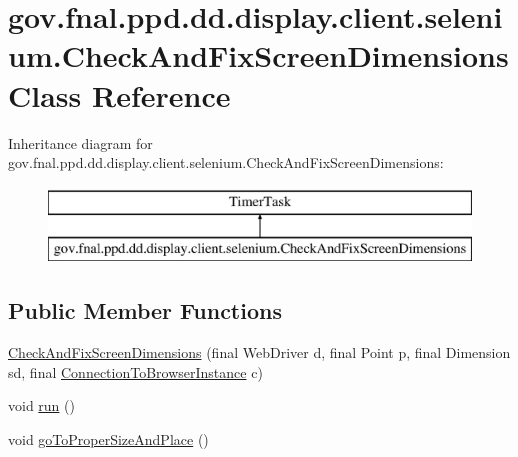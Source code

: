 \hypertarget{classgov_1_1fnal_1_1ppd_1_1dd_1_1display_1_1client_1_1selenium_1_1CheckAndFixScreenDimensions}{\section{gov.\-fnal.\-ppd.\-dd.\-display.\-client.\-selenium.\-Check\-And\-Fix\-Screen\-Dimensions Class Reference}
\label{classgov_1_1fnal_1_1ppd_1_1dd_1_1display_1_1client_1_1selenium_1_1CheckAndFixScreenDimensions}
}
Inheritance diagram for gov.\-fnal.\-ppd.\-dd.\-display.\-client.\-selenium.\-Check\-And\-Fix\-Screen\-Dimensions\-:\begin{figure}[H]
\begin{center}
\leavevmode
\includegraphics[height=2.000000cm]{classgov_1_1fnal_1_1ppd_1_1dd_1_1display_1_1client_1_1selenium_1_1CheckAndFixScreenDimensions}
\end{center}
\end{figure}
\subsection*{Public Member Functions}
\begin{DoxyCompactItemize}
\item 
\hyperlink{classgov_1_1fnal_1_1ppd_1_1dd_1_1display_1_1client_1_1selenium_1_1CheckAndFixScreenDimensions_ab880551add7643dc6df11cae3aaa83b4}{Check\-And\-Fix\-Screen\-Dimensions} (final Web\-Driver d, final Point p, final Dimension sd, final \hyperlink{classgov_1_1fnal_1_1ppd_1_1dd_1_1display_1_1client_1_1ConnectionToBrowserInstance}{Connection\-To\-Browser\-Instance} c)
\item 
void \hyperlink{classgov_1_1fnal_1_1ppd_1_1dd_1_1display_1_1client_1_1selenium_1_1CheckAndFixScreenDimensions_a78a97c7a284cd33ea543d39aaa663ebc}{run} ()
\item 
void \hyperlink{classgov_1_1fnal_1_1ppd_1_1dd_1_1display_1_1client_1_1selenium_1_1CheckAndFixScreenDimensions_ae141a36b6c496443e18172b63c40af35}{go\-To\-Proper\-Size\-And\-Place} ()
\end{DoxyCompactItemize}


